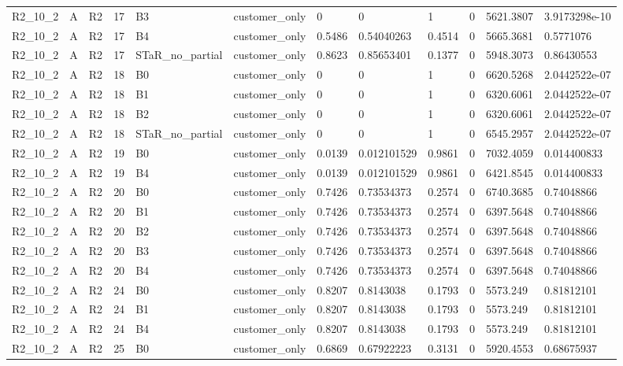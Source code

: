 \begin{longtable}{llllllllllll}
R2\_10\_2 & A & R2 & 17 & B3 & customer\_only & 0 & 0 & 1 & 0 & 5621.3807 & 3.9173298e-10 \\
R2\_10\_2 & A & R2 & 17 & B4 & customer\_only & 0.5486 & 0.54040263 & 0.4514 & 0 & 5665.3681 & 0.5771076 \\
R2\_10\_2 & A & R2 & 17 & STaR\_no\_partial & customer\_only & 0.8623 & 0.85653401 & 0.1377 & 0 & 5948.3073 & 0.86430553 \\
R2\_10\_2 & A & R2 & 18 & B0 & customer\_only & 0 & 0 & 1 & 0 & 6620.5268 & 2.0442522e-07 \\
R2\_10\_2 & A & R2 & 18 & B1 & customer\_only & 0 & 0 & 1 & 0 & 6320.6061 & 2.0442522e-07 \\
R2\_10\_2 & A & R2 & 18 & B2 & customer\_only & 0 & 0 & 1 & 0 & 6320.6061 & 2.0442522e-07 \\
R2\_10\_2 & A & R2 & 18 & STaR\_no\_partial & customer\_only & 0 & 0 & 1 & 0 & 6545.2957 & 2.0442522e-07 \\
R2\_10\_2 & A & R2 & 19 & B0 & customer\_only & 0.0139 & 0.012101529 & 0.9861 & 0 & 7032.4059 & 0.014400833 \\
R2\_10\_2 & A & R2 & 19 & B4 & customer\_only & 0.0139 & 0.012101529 & 0.9861 & 0 & 6421.8545 & 0.014400833 \\
R2\_10\_2 & A & R2 & 20 & B0 & customer\_only & 0.7426 & 0.73534373 & 0.2574 & 0 & 6740.3685 & 0.74048866 \\
R2\_10\_2 & A & R2 & 20 & B1 & customer\_only & 0.7426 & 0.73534373 & 0.2574 & 0 & 6397.5648 & 0.74048866 \\
R2\_10\_2 & A & R2 & 20 & B2 & customer\_only & 0.7426 & 0.73534373 & 0.2574 & 0 & 6397.5648 & 0.74048866 \\
R2\_10\_2 & A & R2 & 20 & B3 & customer\_only & 0.7426 & 0.73534373 & 0.2574 & 0 & 6397.5648 & 0.74048866 \\
R2\_10\_2 & A & R2 & 20 & B4 & customer\_only & 0.7426 & 0.73534373 & 0.2574 & 0 & 6397.5648 & 0.74048866 \\
R2\_10\_2 & A & R2 & 24 & B0 & customer\_only & 0.8207 & 0.8143038 & 0.1793 & 0 & 5573.249 & 0.81812101 \\
R2\_10\_2 & A & R2 & 24 & B1 & customer\_only & 0.8207 & 0.8143038 & 0.1793 & 0 & 5573.249 & 0.81812101 \\
R2\_10\_2 & A & R2 & 24 & B4 & customer\_only & 0.8207 & 0.8143038 & 0.1793 & 0 & 5573.249 & 0.81812101 \\
R2\_10\_2 & A & R2 & 25 & B0 & customer\_only & 0.6869 & 0.67922223 & 0.3131 & 0 & 5920.4553 & 0.68675937 \\

\end{longtable}
